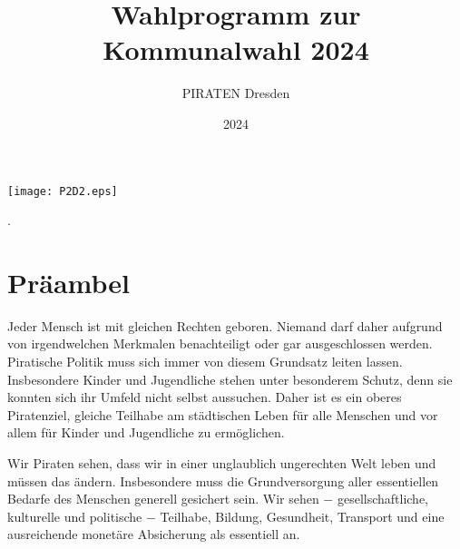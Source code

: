 \documentclass[a4paper, 11pt]{article}
\begin{document}
\title{\Huge{\bf{Wahlprogramm zur \\ Kommunalwahl 2024}}}

\author{\Huge{PIRATEN Dresden}}
\date{\Large{2024}}
\maketitle
\thispagestyle{empty}

\vspace*{8cm}\hspace*{3cm}\texttt{[image: P2D2.eps]}%
\newpage


\thispagestyle{empty}
.

\newpage
\clearpage
{}
\tableofcontents

\newpage

\section{Präambel}
Jeder Mensch ist mit gleichen Rechten geboren. Niemand darf daher aufgrund von irgendwelchen Merkmalen
benachteiligt oder gar ausgeschlossen werden. Piratische Politik muss sich immer von diesem Grundsatz
leiten lassen. Insbesondere Kinder und Jugendliche stehen unter besonderem Schutz, denn sie konnten
sich ihr Umfeld nicht selbst aussuchen. Daher ist es ein oberes Piratenziel, gleiche Teilhabe am städtischen
Leben für alle Menschen und vor allem für Kinder und Jugendliche zu ermöglichen.\newline
\vspace*{0.25cm}

Wir Piraten sehen, dass wir in einer unglaublich ungerechten Welt leben und müssen das ändern. Insbesondere muss die Grundversorgung aller essentiellen Bedarfe des Menschen generell gesichert sein. Wir sehen $-$ gesellschaftliche, kulturelle und politische $-$ Teilhabe, Bildung, Gesundheit, Transport und eine ausreichende monetäre Absicherung als essentiell an.\newline
\vspace*{0.25cm}
\end{document}
